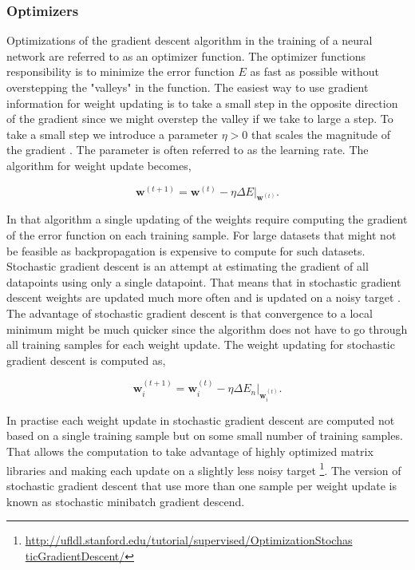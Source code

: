 \subsubsection{Optimizers}\label{sec:optimizers}

Optimizations of the gradient descent algorithm in the training of a neural
network are referred to as an optimizer function. The optimizer functions
responsibility is to minimize the error function $E$ as fast as possible
without overstepping the "valleys" in the function. The easiest way to use
gradient information for weight updating is to take a small step in the opposite
direction of the gradient since we might overstep the valley if we take to large
a step. To take a small step we introduce a parameter $\eta > 0$ that scales the
magnitude of the gradient \citep{Bishop}. The parameter is often referred to as
the learning rate. The algorithm for weight update becomes,

\begin{equation}
    \mathbf{w}^{(t+1)} =
        \mathbf{\mathbf{w}}^{(t)} -
        \eta\Delta E|_{\mathbf{w}^{(t)}}.
\end{equation}

In that algorithm a single updating of the weights require computing the
gradient of the error function on each training sample. For large datasets
that might not be feasible as backpropagation is expensive to compute for such
datasets. Stochastic gradient descent is an attempt at estimating the gradient
of all datapoints using only a single datapoint. That means that in stochastic
gradient descent weights are updated much more often and is updated on a noisy
target \citep{Bishop}. The advantage of stochastic gradient descent is that
convergence to a local minimum might be much quicker since the algorithm does
not have to go through all training samples for each weight update. The weight
updating for stochastic gradient descent is computed as,

\begin{equation}
    \mathbf{w}^{(t+1)}_i =
        \mathbf{\mathbf{w}}^{(t)}_i -
        \eta\Delta E_n|_{\mathbf{w}^{(t)}_i}.
\end{equation}

In practise each weight update in stochastic gradient descent are computed
not based on a single training sample but on some small number of training
samples. That allows the computation to take advantage of highly optimized
matrix libraries and making each update on a slightly less noisy target
\footnote{\url{http://ufldl.stanford.edu/tutorial/supervised/OptimizationStochas
ticGradientDescent/}}. The version of stochastic gradient descent that use more
than one sample per weight update is known as stochastic minibatch gradient
descend.


